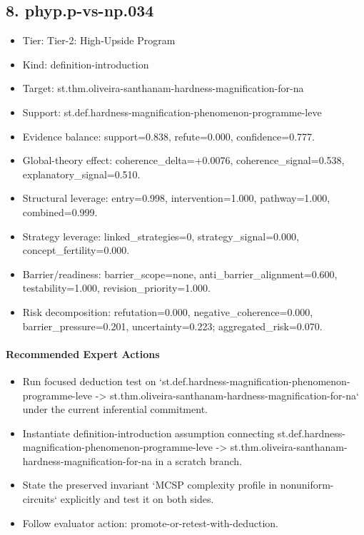 \documentclass[11pt]{article}
\begin{document}
\subsection*{8. phyp.p-vs-np.034}
\begin{itemize}
\item Tier: Tier-2: High-Upside Program
\item Kind: definition-introduction
\item Target: st.thm.oliveira-santhanam-hardness-magnification-for-na
\item Support: st.def.hardness-magnification-phenomenon-programme-leve
\item Evidence balance: support=0.838, refute=0.000, confidence=0.777.
\item Global-theory effect: coherence\_delta=+0.0076, coherence\_signal=0.538, explanatory\_signal=0.510.
\item Structural leverage: entry=0.998, intervention=1.000, pathway=1.000, combined=0.999.
\item Strategy leverage: linked\_strategies=0, strategy\_signal=0.000, concept\_fertility=0.000.
\item Barrier/readiness: barrier\_scope=none, anti\_barrier\_alignment=0.600, testability=1.000, revision\_priority=1.000.
\item Risk decomposition: refutation=0.000, negative\_coherence=0.000, barrier\_pressure=0.201, uncertainty=0.223; aggregated\_risk=0.070.
\end{itemize}
\paragraph{Recommended Expert Actions}
\begin{itemize}
\item Run focused deduction test on `st.def.hardness-magnification-phenomenon-programme-leve -> st.thm.oliveira-santhanam-hardness-magnification-for-na` under the current inferential commitment.
\item Instantiate definition-introduction assumption connecting st.def.hardness-magnification-phenomenon-programme-leve -> st.thm.oliveira-santhanam-hardness-magnification-for-na in a scratch branch.
\item State the preserved invariant `MCSP complexity profile in nonuniform-circuits` explicitly and test it on both sides.
\item Follow evaluator action: promote-or-retest-with-deduction.
\end{itemize}
\end{document}
